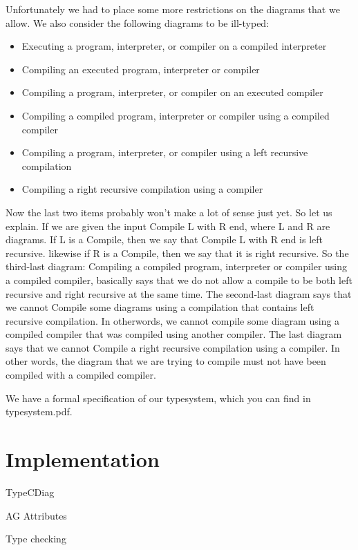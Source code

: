 \documentclass{article}
\begin{document}
Unfortunately we had to place some more restrictions on the diagrams that we allow. We also consider the following diagrams to be ill-typed:

\begin{itemize}
	\item Executing a program, interpreter, or compiler on a compiled interpreter
	\item Compiling an executed program, interpreter or compiler
	\item Compiling a program, interpreter, or compiler on an executed compiler
	\item Compiling a compiled program, interpreter or compiler using a compiled compiler
	\item Compiling a program, interpreter, or compiler using a left recursive compilation
	\item Compiling a right recursive compilation using a compiler
\end{itemize}

Now the last two items probably won't make a lot of sense just yet. So let us explain. If we are given the input Compile L with R end,
where L and R are diagrams. If L is a Compile, then we say that Compile L with R end is left recursive. likewise if R is a Compile, then we say that it is right recursive.
So the third-last diagram: Compiling a compiled program, interpreter or compiler using a compiled compiler, basically says that we do not allow a compile to be both left recursive and right recursive at the same time. The second-last diagram says that we cannot Compile some diagrams using a compilation that contains left recursive compilation. In otherwords, we cannot compile some diagram using a compiled compiler that was compiled using another compiler. The last diagram says that we cannot Compile a right recursive compilation using a compiler.
In other words, the diagram that we are trying to compile must not have been compiled with a compiled compiler.

\hfill \break

We have a formal specification of our typesystem, which you can find in typesystem.pdf.

\section{Implementation}

\begin{subsection}{TypeCDiag}
\begin{subsubsection}{AG Attributes}
\end{subsubsection}
\begin{subsubsection}{Type checking}
\end{subsubsection}
\end{subsection}
\end{document}
